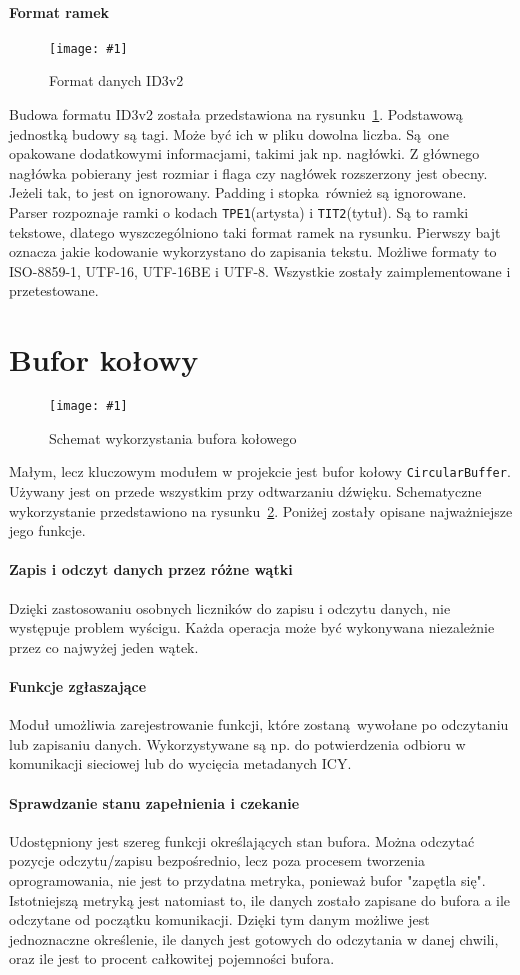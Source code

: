 \documentclass[12pt]{report}
\newcommand{\imgint}[4]{
	\begin{figure}[{#4}]
		\centering
		\texttt{[image: \#1]}
		\caption{#2}
		\label{#1}
	\end{figure}
}
\newcommand{\imgcs}[3]{\imgint{#1}{#2}{#3}{}}
\begin{document}
			\paragraph{Format ramek}
			\imgcs{3/PicoRadio-id3}{Format danych ID3v2}{0.8}
			Budowa formatu ID3v2 została przedstawiona na rysunku~\ref{3/PicoRadio-id3}. Podstawową jednostką budowy są tagi. Może być ich w pliku dowolna liczba. Są one opakowane dodatkowymi informacjami, takimi jak np. nagłówki. Z głównego nagłówka pobierany jest rozmiar i flaga czy nagłówek rozszerzony jest obecny. Jeżeli tak, to jest on ignorowany. Padding i stopka również są ignorowane.
			$ $\\
			
			Parser rozpoznaje ramki o kodach \lstinline|TPE1|(artysta) i \lstinline|TIT2|(tytuł). Są to ramki tekstowe, dlatego wyszczególniono taki format ramek na rysunku. Pierwszy bajt oznacza jakie kodowanie wykorzystano do zapisania tekstu. Możliwe formaty to ISO-8859-1, UTF-16, UTF-16BE i UTF-8. Wszystkie zostały zaimplementowane i przetestowane.
	
	\section{Bufor kołowy}
		\label{sec:circular_buffer}
		\imgcs{3/PicoRadio-buffer}{Schemat wykorzystania bufora kołowego}{0.8}
		Małym, lecz kluczowym modułem w projekcie jest bufor kołowy \lstinline|CircularBuffer|. Używany jest on przede wszystkim przy odtwarzaniu dźwięku. Schematyczne wykorzystanie przedstawiono na rysunku~\ref{3/PicoRadio-buffer}. Poniżej zostały opisane najważniejsze jego funkcje.
		
		\paragraph{Zapis i odczyt danych przez różne wątki}
			Dzięki zastosowaniu osobnych liczników do zapisu i odczytu danych, nie występuje problem wyścigu. Każda operacja może być wykonywana niezależnie przez co najwyżej jeden wątek.
			
		\paragraph{Funkcje zgłaszające}
			Moduł umożliwia zarejestrowanie funkcji, które zostaną wywołane po odczytaniu lub zapisaniu danych. Wykorzystywane są np. do potwierdzenia odbioru w komunikacji sieciowej lub do wycięcia metadanych ICY.
		
		\paragraph{Sprawdzanie stanu zapełnienia i czekanie}
			Udostępniony jest szereg funkcji określających stan bufora. Można odczytać pozycje odczytu/zapisu bezpośrednio, lecz poza procesem tworzenia oprogramowania, nie jest to przydatna metryka, ponieważ bufor "zapętla się". Istotniejszą metryką jest natomiast to, ile danych zostało zapisane do bufora a ile odczytane od początku komunikacji. Dzięki tym danym możliwe jest jednoznaczne określenie, ile danych jest gotowych do odczytania w danej chwili, oraz ile jest to procent całkowitej pojemności bufora.
		
\end{document}
